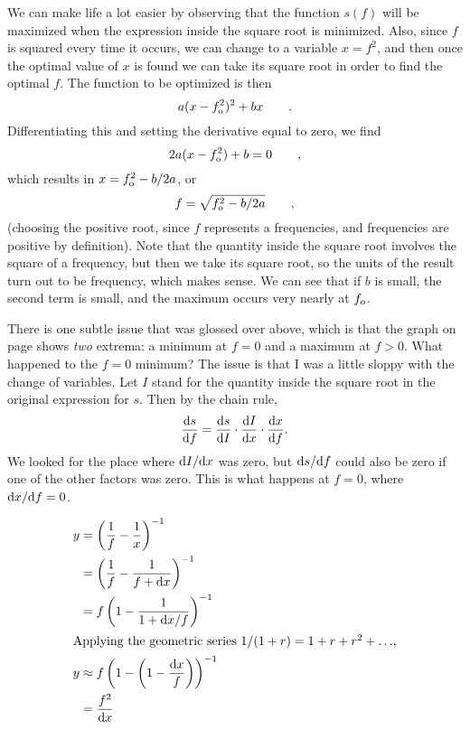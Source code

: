 We can make life a lot easier by observing that the function $s(f)$ will be maximized when the
expression inside the square root is minimized. Also, since $f$ is squared every time it occurs,
we can change to a variable $x=f^2$,
and then once the optimal value of $x$ is found we can take its square root in order to find
the optimal $f$. The function to be optimized is then
\begin{equation*}
  a(x-f_{\textup{o}}^2)^2+bx \qquad .
\end{equation*}
Differentiating this and setting the derivative equal to zero, we find
\begin{equation*}
  2a(x-f_{\textup{o}}^2)+b = 0 \qquad,
\end{equation*}
which results in $x=f_{\textup{o}}^2-b/2a$, or
\begin{equation*}
  f = \sqrt{f_{\textup{o}}^2-b/2a} \qquad,
\end{equation*}
(choosing the positive root, since $f$ represents a frequencies, and frequencies are positive by definition).
Note that the quantity inside the square root involves the square of a frequency, but then we take its
square root, so the units of the result turn out to be frequency, which makes sense. We can see that
if $b$ is small, the second term is small, and the maximum occurs very nearly at
$f_{\textup{o}}$. 

There is one subtle issue that was glossed over above, which is that the graph on page \pageref{fig:resonance}
shows \emph{two} extrema: a minimum at $f=0$ and a maximum at $f>0$. What happened to the $f=0$ minimum?
The issue is that I was a little sloppy with the change of variables. Let $I$ stand for the quantity inside
the square root in the original expression for $s$. Then by the chain rule,
\begin{equation*}
  \frac{\textup{d} s}{\textup{d} f} =   \frac{\textup{d} s}{\textup{d} I} \cdot \frac{\textup{d} I}{\textup{d} x} \cdot \frac{\textup{d} x}{\textup{d} f} .
\end{equation*}
We looked for the place where $\textup{d} I/\textup{d} x$ was zero, but $\textup{d} s/\textup{d} f$ could also be zero if one of the
other factors was zero. This is what happens at $f=0$, where $\textup{d} x/\textup{d} f=0$.


\begin{align*}
  y &= \left(\frac{1}{f}-\frac{1}{x}\right)^{-1} \\
    &= \left(\frac{1}{f}-\frac{1}{f+\textup{d} x}\right)^{-1} \\
    &= f\left(1-\frac{1}{1+\textup{d} x/f}\right)^{-1} \\
\intertext{Applying the geometric series $1/(1+r)=1+r+r^2+\ldots$,}
  y &\approx f\left(1-\left(1-\frac{\textup{d} x}{f}\right)\right)^{-1} \\
    &= \frac{f^2}{\textup{d} x} 
\end{align*}

